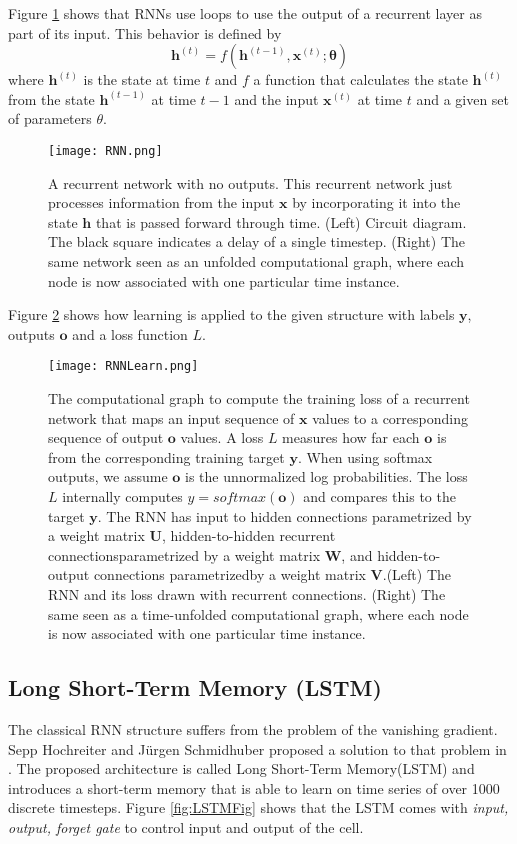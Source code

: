 Figure \ref{fig:RNN} shows that RNNs use loops to use the output of a recurrent layer as part of its input. 
This behavior is defined by
\begin{equation}
\mathbf{h}^{(t)} = f(\mathbf{h}^{(t-1)}, \mathbf{x}^{(t)}; \mathbf{\theta})  
\end{equation}\label{eq:RNN}
where $\mathbf{h}^{(t)}$ is the state at time $t$ and $f$ a function that calculates the state $\mathbf{h}^{(t)}$ from the state $\mathbf{h}^{(t-1)}$ at time $t-1$ and the input $\mathbf{x}^{(t)}$ at time $t$ and a given set of parameters $\theta$.
\begin{figure}
\centering
  \texttt{[image: RNN.png]}
  \caption{A recurrent network with no outputs. This recurrent network just processes information from the input $\mathbf{x}$ by incorporating it into the state $\mathbf{h}$ that is passed forward through time. (Left) Circuit diagram. The black square indicates a delay of a single timestep. (Right) The same network seen as an unfolded computational graph, where each node is now associated with one particular time instance. \cite{Goodfellow-et-al-2016}
}\label{fig:RNN}
\end{figure}
Figure \ref{fig:RNNLearn} shows how learning is applied to the given structure with labels $\mathbf{y}$, outputs $\mathbf{o}$ and a loss function $L$.
\begin{figure}
\centering
  \texttt{[image: RNNLearn.png]}
  \caption{The computational graph to compute the training loss of a  recurrent 
  network that maps an input sequence of 
$\mathbf{x}$ 
 values to a corresponding sequence of output $\mathbf{o}$ values. A loss $L$ measures how far each $\mathbf{o}$ is from the corresponding training target $\mathbf{y}$. When using softmax outputs, we assume $\mathbf{o}$ is the unnormalized log probabilities. The loss $L$ internally computes $\hat{y}=softmax(\mathbf{o})$ and compares this to the target $\mathbf{y}$. The RNN has input to hidden connections parametrized by a weight matrix $\mathbf{U}$, hidden-to-hidden recurrent connectionsparametrized by a weight matrix $\mathbf{W}$, and hidden-to-output connections parametrizedby a weight matrix $\mathbf{V}$.(Left) The RNN and its loss drawn with recurrent connections. (Right) The same seen as a time-unfolded computational graph, where each node is now associated with one particular time instance. \cite{Goodfellow-et-al-2016}
}\label{fig:RNNLearn}
\end{figure}


\subsection{Long Short-Term Memory (LSTM)}\label{ssec:LSTM}
The classical RNN structure suffers from the problem of the vanishing gradient.
Sepp Hochreiter and Jürgen Schmidhuber proposed a solution to that problem in \cite{LSTM}.
The proposed architecture is called Long Short-Term Memory(LSTM) and introduces a short-term memory that is able to learn on time series of over 1000 discrete timesteps.
Figure \ref{fig:LSTMFig} shows that the LSTM comes with \emph{input, output, forget gate} to control input and output of the cell.

